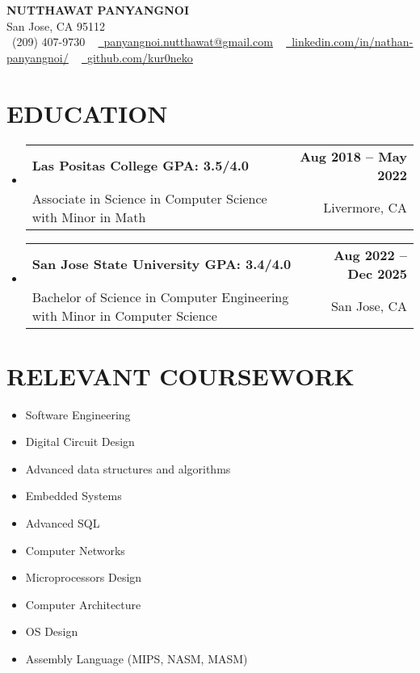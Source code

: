 \documentclass[letterpaper,11pt]{article}
\makeatletter
\newcommand{\resumeSubheading}[4]{
  \vspace{-2pt}\item
    \begin{tabular*}{1.0\textwidth}[t]{l@{\extracolsep{\fill}}r}
      \textbf{#1} & \textbf{\small #2} \\
      {\small#3} & {\small #4} \\
    \end{tabular*}\vspace{-7pt}
}
\newcommand{\resumeSubHeadingListStart}{\begin{itemize}[leftmargin=0.0in, label={}]}
\newcommand{\resumeSubHeadingListEnd}{\end{itemize}}
\makeatother
\begin{document}
\vspace{-15pt}
\begin{center}
    {\large \scshape\textbf{NUTTHAWAT PANYANGNOI}} \\
    \vspace{0.4pt} San Jose, CA 95112 \\ \vspace{1pt} 
    \small \raisebox{-0.1\height}\faPhone\ (209) 407-9730 ~ \href{mailto:panyangnoi.nutthawat@gmail.com}{\raisebox{-0.2\height}\faEnvelope\  \underline{panyangnoi.nutthawat@gmail.com}} ~ 
    \href{https://www.linkedin.com/in/nathan-panyangnoi/}{\raisebox{-0.2\height}\faLinkedin\ \underline{linkedin.com/in/nathan-panyangnoi/}}  ~
    \href{https://github.com/kur0neko}{\raisebox{-0.2\height}\faGithub\ \underline{github.com/kur0neko}}
    \vspace{-8pt}
\end{center}

\section{EDUCATION}
  \resumeSubHeadingListStart
    \resumeSubheading
      {Las Positas College        GPA: 3.5/4.0}{Aug 2018 -- May 2022}
      {{Associate in Science in Computer Science with Minor in Math}}{Livermore, CA}
    \resumeSubheading
      {San Jose State University  GPA: 3.4/4.0}{Aug 2022 -- Dec 2025}
      {{Bachelor of Science in Computer Engineering with Minor in Computer Science}}{San Jose, CA}  
  \resumeSubHeadingListEnd

\section{RELEVANT COURSEWORK}
    \begin{multicols}{4}
        \begin{itemize}[itemsep=-1pt, parsep=3pt]
            \item \small Software Engineering
            \item \small Digital Circuit Design 
            \item \small Advanced data structures and algorithms
            \item \small Embedded Systems
            \item \small Advanced SQL 
            \item \small Computer Networks
            \item \small Microprocessors Design
            \item \small Computer Architecture
            \item \small OS Design
            \item \small Assembly Language (MIPS, NASM, MASM)
        \end{itemize}
    \end{multicols}
    \vspace*{1.5\multicolsep}
\vspace{-1pt}
\end{document}
